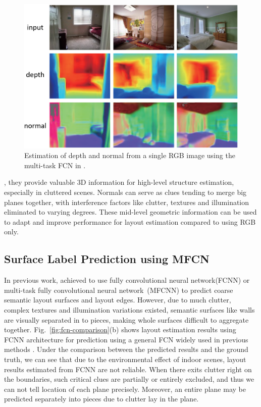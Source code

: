 \begin{figure}
	\centering
	\includegraphics[width=\columnwidth]{figure/geometricinfo1.png}
	\caption{Estimation of depth and normal from a single RGB image using the multi-task FCN in \cite{eigen2015predicting}.}
	\label{fig:depthandnormal}
\end{figure}

, they provide valuable 3D information for high-level structure estimation, especially in cluttered scenes.
%
Normals can serve as clues tending to merge big planes together, with interference factors like clutter, textures and illumination eliminated to varying degrees. 
%
These mid-level geometric information can be used to adapt and improve performance for layout estimation compared to using RGB only. 



\subsection{Surface Label Prediction using MFCN}
\label{sec:surfacelabel}
%
In previous work, \cite{dasgupta2016delay,ren2016coarse} achieved to use fully convolutional neural network(FCNN) or multi-task fully convolutional neural network~(MFCNN) to predict coarse semantic layout surfaces and layout edges. 
%
However, due to much clutter, complex textures and illumination variations existed, semantic surfaces like walls are visually separated in to pieces, making whole surfaces difficult to aggregate together. 
%
Fig.~\ref{fig:fcn-comparison}(b) shows layout estimation results using FCNN architecture for prediction using a general FCN widely used in previous methods \cite{dasgupta2016delay,ren2016coarse}. 
Under the comparison between the predicted results and the ground truth, we can see that due to the environmental effect of indoor scenes, layout results estimated from FCNN are not reliable. 
When there exits clutter right on the boundaries, such critical clues are partially or entirely excluded, and thus we can not tell location of each plane precisely. 
Moreover, an entire plane may be predicted separately into pieces due to clutter lay in the plane.

